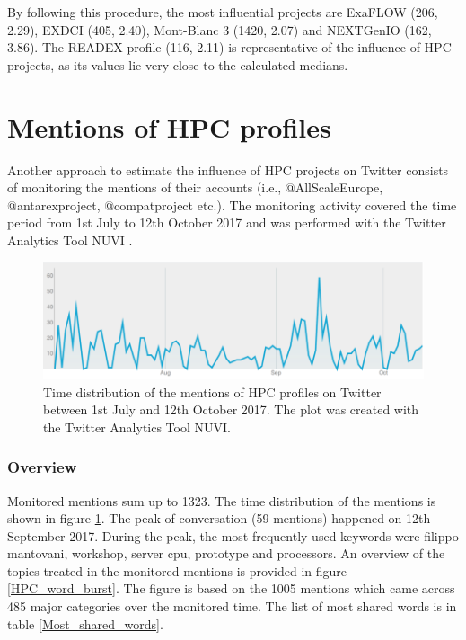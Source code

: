 By following this procedure, the most influential projects are ExaFLOW (206, 2.29), EXDCI (405, 2.40), Mont-Blanc 3 (1420, 2.07) and NEXTGenIO (162, 3.86). The READEX profile (116, 2.11) is representative of the influence of HPC projects, as its values lie very close to the calculated medians.

\section{Mentions of HPC profiles} \label{Mentions_of_HPC_profiles} 
Another approach to estimate the influence of HPC projects on Twitter consists of monitoring the mentions of their accounts (i.e., @AllScaleEurope, @antarex\textunderscore project, @compatproject etc.). The monitoring activity covered the time period from 1st July to 12th October 2017 and was performed with the Twitter Analytics Tool NUVI \cite{NUVI}.  

\begin{figure}[!t] 
 \begin{center}
 \includegraphics[scale=0.4]{Images/NUVI_time_distribution.png}
 \caption{Time distribution of the mentions of HPC profiles on Twitter between 1st July and 12th October 2017. The plot was created with the Twitter Analytics Tool NUVI.}
 \label{NUVI_time_distribution}
 \end{center}
\end{figure}

\subsubsection{Overview}
Monitored mentions sum up to 1323. The time distribution of the mentions is shown in figure \ref{NUVI_time_distribution}. The peak of conversation (59 mentions) happened on 12th September 2017. During the peak, the most frequently used keywords were filippo mantovani, workshop, server cpu, prototype and processors. An overview of the topics treated in the monitored mentions is provided in figure \ref{HPC_word_burst}. The figure is based on the 1005 mentions which came across 485 major categories over the monitored time. The list of most shared words is in table \ref{Most_shared_words}.

